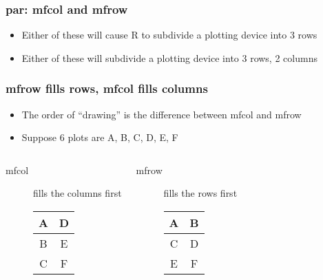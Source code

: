\documentclass[11pt,english]{beamer}
\newenvironment{topcolumns}{\begin{columns}[t]}{\end{columns}}
\begin{document}
\begin{frame}[containsverbatim]
  \frametitle{par: mfcol and mfrow}
  \begin{itemize}
  \item Either of these will cause R to subdivide a plotting device into 3 rows

  \item Either of these will subdivide a plotting device into 3 rows, 2 columns

  \end{itemize}
\end{frame}


\begin{frame}[containsverbatim]
  \frametitle{mfrow fills rows, mfcol fills columns}
  \begin{itemize}

  \item The order of ``drawing'' is the difference between mfcol and mfrow

  \item  Suppose 6 plots are A, B, C, D, E, F
  \end{itemize}

\begin{topcolumns}
  \column{6cm}
  \begin{description}
    \item [mfcol]  fills the columns first
      \begin{tabular}{|c|c|}
        \hline
        A & D \tabularnewline
        \hline
        \hline
        B & E\tabularnewline
        \hline
         \hline
        C & F\tabularnewline
        \hline
         \hline
      \end{tabular}
    \end{description}

   \column{6cm}
   \begin{description}

   \item [mfrow]  fills the rows first

     \begin{tabular}{|c|c|}
       \hline
       A & B \tabularnewline
       \hline
       \hline
       C & D\tabularnewline
       \hline
       \hline
       E & F\tabularnewline
       \hline
       \hline
     \end{tabular}
   \end{description}
 \end{topcolumns}
\end{frame}
\end{document}
